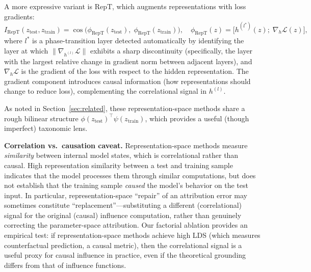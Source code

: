 \documentclass{article}
\begin{document}
A more expressive variant is RepT, which augments representations with loss gradients:
\begin{equation}
I_\text{RepT}(z_\text{test}, z_\text{train}) = \cos\bigl(\phi_\text{RepT}(z_\text{test}),\; \phi_\text{RepT}(z_\text{train})\bigr), \quad \phi_\text{RepT}(z) = \bigl[h^{(l^*)}(z);\; \nabla_h \mathcal{L}(z)\bigr],
\label{eq:rept}
\end{equation}
where $l^*$ is a phase-transition layer detected automatically by identifying the layer at which $\|\nabla_{h^{(l)}} \mathcal{L}\|$ exhibits a sharp discontinuity (specifically, the layer with the largest relative change in gradient norm between adjacent layers), and $\nabla_h \mathcal{L}$ is the gradient of the loss with respect to the hidden representation. The gradient component introduces causal information (how representations should change to reduce loss), complementing the correlational signal in $h^{(l)}$.

As noted in Section~\ref{sec:related}, these representation-space methods share a rough bilinear structure $\phi(z_\text{test})^\top \psi(z_\text{train})$, which provides a useful (though imperfect) taxonomic lens.

\textbf{Correlation vs.\ causation caveat.} Representation-space methods measure \emph{similarity} between internal model states, which is correlational rather than causal. High representation similarity between a test and training sample indicates that the model processes them through similar computations, but does not establish that the training sample \emph{caused} the model's behavior on the test input. In particular, representation-space ``repair'' of an attribution error may sometimes constitute ``replacement''---substituting a different (correlational) signal for the original (causal) influence computation, rather than genuinely correcting the parameter-space attribution. Our factorial ablation provides an empirical test: if representation-space methods achieve high LDS (which measures counterfactual prediction, a causal metric), then the correlational signal is a useful proxy for causal influence in practice, even if the theoretical grounding differs from that of influence functions.
\end{document}
